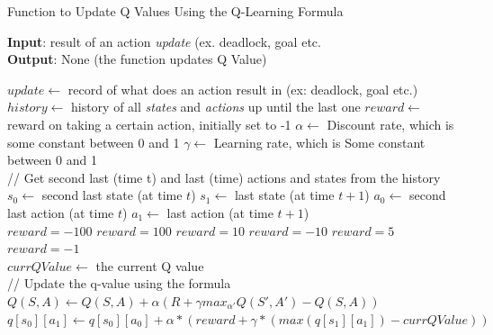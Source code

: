 \documentclass{article}
\begin{document}
\begin{algorithm}
    \caption{Function to Update Q Values Using the Q-Learning Formula}\label{euclid}
    \hspace*{\algorithmicindent} \textbf{Input}: result of an action \emph{update} (ex. deadlock, goal etc. \\
    \hspace*{\algorithmicindent} \textbf{Output}: None (the function updates Q Value) \\
    \begin{algorithmic}
    \State $update \gets$ record of what does an action result in (ex: deadlock, goal etc.) 
    \State $history \gets$ history of all \emph{states} and \emph{actions} up until the last one
    \State $reward \gets$ reward on taking a certain action, initially set to -1
    \State $\alpha \gets$ Discount rate, which is some constant between 0 and 1
    \State $\gamma \gets$ Learning rate, which is Some constant between 0 and 1 \\
    // Get second last (time t) and last (time) actions and states from the history 
    \State $s_0 \gets$ second last state (at time $t$)
    \State $s_1 \gets$ last state (at time $t+1$)
    \State $a_0 \gets$ second last action (at time $t$)
    \State $a_1 \gets$ last action (at time $t+1$) \\
    
        \State $reward = -100$
        \State $reward = 100$
        \State $reward = 10$
        \State $reward = -10$
        \State $reward = 5$
        \State $reward = -1$
    \EndIf \\
    
    \State $currQValue \gets$ the current Q value \\
    // Update the q-value using the formula $Q(S,A) \leftarrow Q(S,A) + \alpha(R + \gamma max_{\alpha'}Q(S',A') - Q(S,A))$ \\
    \State $q[s_0][a_1] \gets q[s_0][a_0] + \alpha * (reward + \gamma * (max(q[s_1][a_1]) - currQValue))$
    \end{algorithmic}
\end{algorithm}
\end{document}
